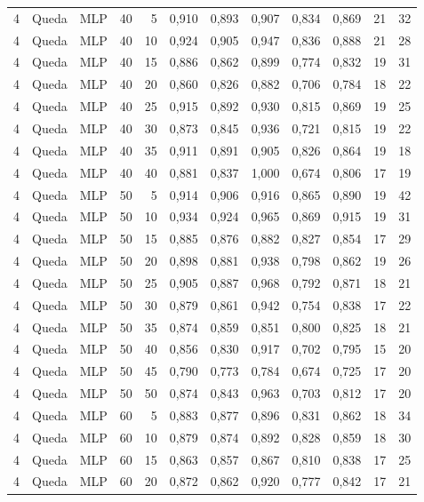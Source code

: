 \begin{longtable}{@{}rllrrrrrrrrr@{}}
4 & Queda & MLP & 40 & 5 & 0,910 & 0,893 & 0,907 & 0,834 & 0,869 & 21 & 32 \\
4 & Queda & MLP & 40 & 10 & 0,924 & 0,905 & 0,947 & 0,836 & 0,888 & 21 & 28 \\
4 & Queda & MLP & 40 & 15 & 0,886 & 0,862 & 0,899 & 0,774 & 0,832 & 19 & 31 \\
4 & Queda & MLP & 40 & 20 & 0,860 & 0,826 & 0,882 & 0,706 & 0,784 & 18 & 22 \\
4 & Queda & MLP & 40 & 25 & 0,915 & 0,892 & 0,930 & 0,815 & 0,869 & 19 & 25 \\
4 & Queda & MLP & 40 & 30 & 0,873 & 0,845 & 0,936 & 0,721 & 0,815 & 19 & 22 \\
4 & Queda & MLP & 40 & 35 & 0,911 & 0,891 & 0,905 & 0,826 & 0,864 & 19 & 18 \\
4 & Queda & MLP & 40 & 40 & 0,881 & 0,837 & 1,000 & 0,674 & 0,806 & 17 & 19 \\
4 & Queda & MLP & 50 & 5 & 0,914 & 0,906 & 0,916 & 0,865 & 0,890 & 19 & 42 \\
4 & Queda & MLP & 50 & 10 & 0,934 & 0,924 & 0,965 & 0,869 & 0,915 & 19 & 31 \\
4 & Queda & MLP & 50 & 15 & 0,885 & 0,876 & 0,882 & 0,827 & 0,854 & 17 & 29 \\
4 & Queda & MLP & 50 & 20 & 0,898 & 0,881 & 0,938 & 0,798 & 0,862 & 19 & 26 \\
4 & Queda & MLP & 50 & 25 & 0,905 & 0,887 & 0,968 & 0,792 & 0,871 & 18 & 21 \\
4 & Queda & MLP & 50 & 30 & 0,879 & 0,861 & 0,942 & 0,754 & 0,838 & 17 & 22 \\
4 & Queda & MLP & 50 & 35 & 0,874 & 0,859 & 0,851 & 0,800 & 0,825 & 18 & 21 \\
4 & Queda & MLP & 50 & 40 & 0,856 & 0,830 & 0,917 & 0,702 & 0,795 & 15 & 20 \\
4 & Queda & MLP & 50 & 45 & 0,790 & 0,773 & 0,784 & 0,674 & 0,725 & 17 & 20 \\
4 & Queda & MLP & 50 & 50 & 0,874 & 0,843 & 0,963 & 0,703 & 0,812 & 17 & 20 \\
4 & Queda & MLP & 60 & 5 & 0,883 & 0,877 & 0,896 & 0,831 & 0,862 & 18 & 34 \\
4 & Queda & MLP & 60 & 10 & 0,879 & 0,874 & 0,892 & 0,828 & 0,859 & 18 & 30 \\
4 & Queda & MLP & 60 & 15 & 0,863 & 0,857 & 0,867 & 0,810 & 0,838 & 17 & 25 \\
4 & Queda & MLP & 60 & 20 & 0,872 & 0,862 & 0,920 & 0,777 & 0,842 & 17 & 21 \\

\end{longtable}
